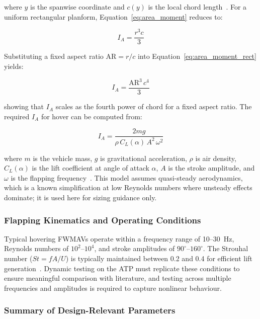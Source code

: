 \noindent where $y$ is the spanwise coordinate and $c(y)$ is the local chord length~\cite{oppenheimer2017}. For a uniform rectangular planform, Equation~\ref{eq:area_moment} reduces to:

\begin{equation}
    I_A = \frac{r^3 c}{3}
    \label{eq:area_moment_rect}
\end{equation}

\noindent Substituting a fixed aspect ratio $\text{AR} = r/c$ into Equation~\ref{eq:area_moment_rect} yields:

\begin{equation}
    I_A = \frac{\text{AR}^3\, c^4}{3}
    \label{eq:area_moment_ar}
\end{equation}

\noindent showing that $I_A$ scales as the fourth power of chord for a fixed aspect ratio. The required $I_A$ for hover can be computed from:

\begin{equation}
    I_A = \frac{2mg}{\rho\, C_L(\alpha)\, A^2\, \omega^2}
    \label{eq:hover_condition}
\end{equation}

\noindent where $m$ is the vehicle mass, $g$ is gravitational acceleration, $\rho$ is air density, $C_L(\alpha)$ is the lift coefficient at angle of attack $\alpha$, $A$ is the stroke amplitude, and $\omega$ is the flapping frequency~\cite{oppenheimer2017}. This model assumes quasi-steady aerodynamics, which is a known simplification at low Reynolds numbers where unsteady effects dominate; it is used here for sizing guidance only.

\subsubsection{Flapping Kinematics and Operating Conditions}

Typical hovering FWMAVs operate within a frequency range of 10--30~Hz, Reynolds numbers of $10^2$--$10^4$, and stroke amplitudes of $90^\circ$--$160^\circ$. The Strouhal number ($St = fA/U$) is typically maintained between 0.2 and 0.4 for efficient lift generation~\cite{taylor2003flying}. Dynamic testing on the ATP must replicate these conditions to ensure meaningful comparison with literature, and testing across multiple frequencies and amplitudes is required to capture nonlinear behaviour.

\subsubsection{Summary of Design-Relevant Parameters}

